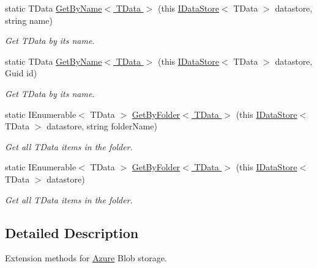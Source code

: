 \begin{DoxyCompactItemize}
\item 
static T\+Data \hyperlink{classCqrs_1_1Azure_1_1BlobStorage_1_1BlobStorageStoreExtensions_a05556de9a118a0be43dd328b29591d2d_a05556de9a118a0be43dd328b29591d2d}{Get\+By\+Name$<$ T\+Data $>$} (this \hyperlink{interfaceCqrs_1_1DataStores_1_1IDataStore}{I\+Data\+Store}$<$ T\+Data $>$ datastore, string name)
\begin{DoxyCompactList}\small\item\em Get {\itshape T\+Data}  by its name. \end{DoxyCompactList}\item 
static T\+Data \hyperlink{classCqrs_1_1Azure_1_1BlobStorage_1_1BlobStorageStoreExtensions_a21e2becce47e62b14f2b6ef659ac646b_a21e2becce47e62b14f2b6ef659ac646b}{Get\+By\+Name$<$ T\+Data $>$} (this \hyperlink{interfaceCqrs_1_1DataStores_1_1IDataStore}{I\+Data\+Store}$<$ T\+Data $>$ datastore, Guid id)
\begin{DoxyCompactList}\small\item\em Get {\itshape T\+Data}  by its name. \end{DoxyCompactList}\item 
static I\+Enumerable$<$ T\+Data $>$ \hyperlink{classCqrs_1_1Azure_1_1BlobStorage_1_1BlobStorageStoreExtensions_a68980261b5e1806826f23e38fcb9a838_a68980261b5e1806826f23e38fcb9a838}{Get\+By\+Folder$<$ T\+Data $>$} (this \hyperlink{interfaceCqrs_1_1DataStores_1_1IDataStore}{I\+Data\+Store}$<$ T\+Data $>$ datastore, string folder\+Name)
\begin{DoxyCompactList}\small\item\em Get all {\itshape T\+Data}  items in the folder. \end{DoxyCompactList}\item 
static I\+Enumerable$<$ T\+Data $>$ \hyperlink{classCqrs_1_1Azure_1_1BlobStorage_1_1BlobStorageStoreExtensions_a71348a56844b38342f7d9e6d979fa3f6_a71348a56844b38342f7d9e6d979fa3f6}{Get\+By\+Folder$<$ T\+Data $>$} (this \hyperlink{interfaceCqrs_1_1DataStores_1_1IDataStore}{I\+Data\+Store}$<$ T\+Data $>$ datastore)
\begin{DoxyCompactList}\small\item\em Get all {\itshape T\+Data}  items in the folder. \end{DoxyCompactList}\end{DoxyCompactItemize}


\subsection{Detailed Description}
Extension methods for \hyperlink{namespaceCqrs_1_1Azure}{Azure} Blob storage. 



